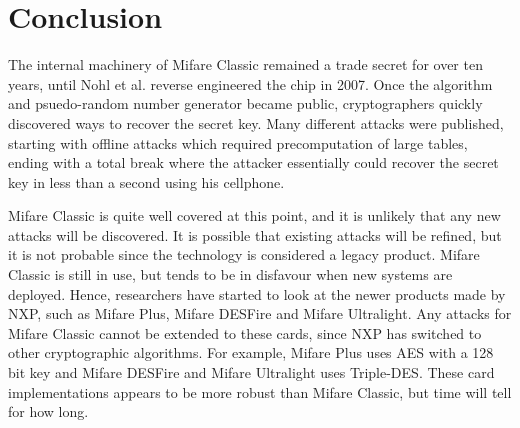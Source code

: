 \documentclass[10pt,twocolumn]{article}
\begin{document}
\section{Conclusion}
The internal machinery of Mifare Classic remained a trade secret for over ten years, until Nohl et al. \cite{nohl08} reverse engineered the chip in 2007. Once the algorithm and psuedo-random number generator became public, cryptographers quickly discovered ways to recover the secret key. Many different attacks were published, starting with offline attacks which required precomputation of large tables, ending with a total break where the attacker essentially could recover the secret key in less than a second using his cellphone. 

Mifare Classic is quite well covered at this point, and it is unlikely that any new attacks will be discovered. It is possible that existing attacks will be refined, but it is not probable since the technology is considered a legacy product. Mifare Classic is still in use, but tends to be in disfavour when new systems are deployed. Hence, researchers have started to look at the newer products made by NXP, such as Mifare Plus, Mifare DESFire and Mifare Ultralight. Any attacks for Mifare Classic cannot be extended to these cards, since NXP has switched to other cryptographic algorithms. For example, Mifare Plus uses AES with a 128 bit key and Mifare DESFire and Mifare Ultralight uses Triple-DES. These card implementations appears to be more robust than Mifare Classic, but time will tell for how long.




\onecolumn
\end{document}
